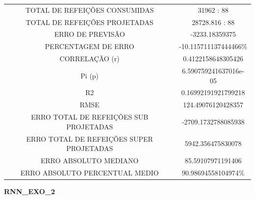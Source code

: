 \documentclass[	12pt, Times, openright, twoside, a4paper, english, brazil]{abntex2}
\begin{document}
                    \begin{tabular}{|c|c|}
                    \rowcolor{gray!50}
                    \hline
                \multicolumn{2}{c}{RNN\_EXO\_1:} \\
                \hline
                TOTAL DE REFEIÇÕES CONSUMIDAS & 31962 : 88  \\
                TOTAL DE REFEIÇÕES PROJETADAS & 28728.816 : 88  \\
                ERRO DE PREVISÃO & -3233.18359375 \\
                PERCENTAGEM DE ERRO & -10.115711137444466\%  \\
                CORRELAÇÃO (r) & 0.4122158648305426 \\ Pi (p) & 6.590759241637016e-05\\ R2 & 0.16992191921799218\\
                RMSE & 124.49076120428357\\
                ERRO TOTAL DE REFEIÇÕES SUB PROJETADAS & -2709.1732788085938\\
                ERRO TOTAL DE REFEIÇÕES SUPER PROJETADAS & 5942.356475830078\\
                ERRO ABSOLUTO MEDIANO & 85.59107971191406\\
                ERRO ABSOLUTO PERCENTUAL MEDIO & 90.98694558104974\% \\ \hline \end{tabular}
                
              \newpage  
              \textbf{RNN\_EXO\_2}
                \begin{figure}[H]
                \end{figure}
\end{document}
